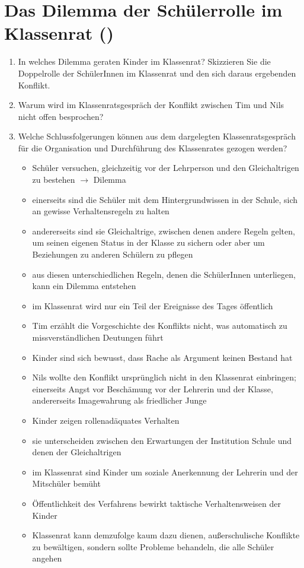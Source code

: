 \newpage
\section{Das Dilemma der Schülerrolle im Klassenrat (\cite{DB08})}
\begin{enumerate}
	\item{
		In welches Dilemma geraten Kinder im Klassenrat?
		Skizzieren Sie die Doppelrolle der SchülerInnen im Klassenrat und den sich daraus ergebenden Konflikt.
	}
	\item{Warum wird im Klassenratsgespräch der Konflikt zwischen Tim und Nils nicht \glqq offen\grqq{} besprochen?}
	\item{
		Welche Schlussfolgerungen können aus dem dargelegten Klassenratsgespräch für die Organisation und Durchführung des Klassenrates gezogen werden?
		\begin{itemize}
			\item{Schüler versuchen, gleichzeitig vor der Lehrperson und den Gleichaltrigen zu bestehen $\rightarrow$ Dilemma}
			\item{einerseits sind die Schüler mit dem Hintergrundwissen in der Schule, sich an gewisse Verhaltensregeln zu halten}
			\item{andererseits sind sie Gleichaltrige, zwischen denen andere Regeln gelten, um seinen eigenen Status in der Klasse zu sichern oder aber um Beziehungen zu anderen Schülern zu pflegen}
			\item{aus diesen unterschiedlichen Regeln, denen die SchülerInnen unterliegen, kann ein Dilemma entstehen}
			\item{im Klassenrat wird nur ein Teil der Ereignisse des Tages öffentlich}
			\item{Tim erzählt die Vorgeschichte des Konflikts nicht, was automatisch zu missverständlichen Deutungen führt}
			\item{Kinder sind sich bewusst, dass Rache als Argument keinen Bestand hat}
			\item{Nils wollte den Konflikt ursprünglich nicht in den Klassenrat einbringen; einerseits Angst vor Beschämung vor der Lehrerin und der Klasse, andererseits Imagewahrung als friedlicher Junge}
			\item{Kinder zeigen rollenadäquates Verhalten}
			\item{sie unterscheiden zwischen den Erwartungen der Institution Schule und denen der Gleichaltrigen}
			\item{im Klassenrat sind Kinder um soziale Anerkennung der Lehrerin und der Mitschüler bemüht}
			\item{Öffentlichkeit des Verfahrens bewirkt taktische Verhaltensweisen der Kinder}
			\item{Klassenrat kann demzufolge kaum dazu dienen, außerschulische Konflikte zu bewältigen, sondern sollte Probleme behandeln, die alle Schüler angehen}
		\end{itemize}
	}
\end{enumerate}


